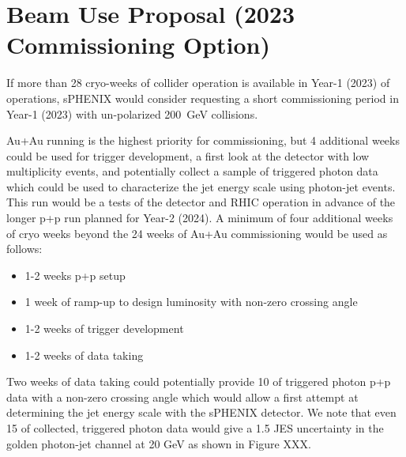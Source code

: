 \chapter{Beam Use Proposal (2023 \pp Commissioning Option)}
\label{chap:year1pp}

If more than 28 cryo-weeks of collider operation is available in Year-1 (2023) of operations, 
sPHENIX would consider requesting a short commissioning period in Year-1 (2023) with 
un-polarized 200~GeV \pp collisions.



Au+Au running is the highest priority for commissioning, but 4 additional 
weeks could be used for trigger development, a first look at the detector with
low multiplicity events, and potentially collect a sample of triggered photon
data which could be used to characterize the jet energy scale using photon-jet
events.
This run would be a tests of the detector and RHIC operation in advance of
the longer p+p run planned for Year-2 (2024). 
A minimum of four additional weeks of cryo weeks beyond the 24 weeks of Au+Au
commissioning would be used as follows:

\begin{itemize}

\item 1-2 weeks p+p setup
\item 1 week of ramp-up to design luminosity with non-zero crossing
angle
\item 1-2 weeks of trigger development
\item 1-2 weeks of data taking

\end{itemize}

Two weeks of data taking could potentially provide 10 \pb of triggered photon
p+p data with a non-zero crossing angle which would allow a first attempt 
at determining the jet energy scale with the sPHENIX detector.
We note that even 15 \pb of collected, triggered photon data would give a 1.5%
JES uncertainty in the golden photon-jet channel at 20 GeV as shown in Figure XXX.